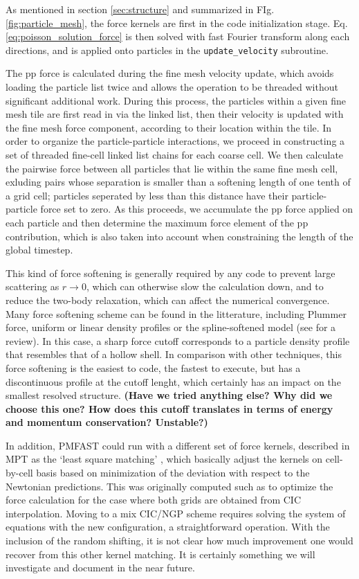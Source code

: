 As mentioned in section \ref{sec:structure} and summarized in FIg. \ref{fig:particle_mesh},
the force kernels are first  in the code initialization stage.
Eq. \ref{eq:poisson_solution_force} is then solved with fast Fourier transform along each directions, 
 and is applied onto particles in the {\tt update\_velocity} subroutine.

The pp force is calculated during the fine mesh velocity update, which avoids loading the particle list twice and allows the operation to be threaded without significant additional work. During this process, the particles within a given fine mesh tile are first read in via the linked list, 
then their velocity is updated with the fine mesh force component, according to their location within the tile. 
In order to organize the particle-particle interactions, we proceed in constructing a set of threaded fine-cell linked list chains for each coarse cell. 
We then calculate the pairwise force between all particles that lie within the same fine mesh cell, exluding pairs whose separation is smaller than a softening length of one tenth of a grid cell; particles seperated by less than this distance have their 
particle-particle force set to zero.  As this proceeds, we accumulate the  pp force applied on each particle and then determine the maximum force element of the pp contribution, which is also taken into account when constraining the length of the global timestep. 

This kind of force softening is generally required by any code to prevent
large scattering as $r \rightarrow 0$, which can otherwise slow the calculation down, 
and to reduce the two-body relaxation, which can affect the numerical convergence. 
Many force softening scheme can be found in the litterature, including Plummer force, uniform or linear density profiles or the spline-softened model 
(see \cite{Dyer1993} for a review). In this case, a sharp force cutoff corresponds to a particle density profile that resembles that of a hollow shell.
In comparison with other techniques, this  force softening is the easiest to code, the fastest to execute, but has a discontinuous profile at the cutoff lenght,
which certainly has an impact on the smallest resolved structure. 
{\bf (Have we tried anything else? Why did we choose this one? How does this cutoff translates in terms of energy and momentum conservation? Unstable?)}

In addition, {\small PMFAST} could run with a different set of force kernels, described in MPT as the `least square matching' , 
which basically adjust the kernels on cell-by-cell basis based on minimization of the deviation with respect
to the Newtonian predictions. This was originally computed such as to optimize the force calculation for
the case where both grids are obtained from CIC interpolation. Moving to a mix CIC/NGP scheme
requires solving the system of equations with the new configuration, a straightforward operation.
 With the inclusion of the random shifting, it is not clear how much improvement 
one would recover from this other kernel matching.  It is certainly something
we will investigate and document in the near future.


